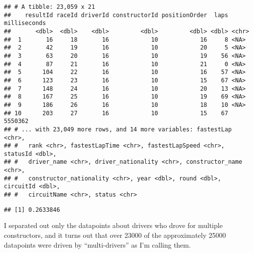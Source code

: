 \documentclass[
]{article}
\newenvironment{Shaded}{\begin{snugshade}}{\end{snugshade}}
\newcommand{\CommentTok}[1]{\textcolor[rgb]{0.56,0.35,0.01}{\textit{#1}}}
\newcommand{\DataTypeTok}[1]{\textcolor[rgb]{0.13,0.29,0.53}{#1}}
\newcommand{\KeywordTok}[1]{\textcolor[rgb]{0.13,0.29,0.53}{\textbf{#1}}}
\newcommand{\NormalTok}[1]{#1}
\newcommand{\OperatorTok}[1]{\textcolor[rgb]{0.81,0.36,0.00}{\textbf{#1}}}
\newcommand{\StringTok}[1]{\textcolor[rgb]{0.31,0.60,0.02}{#1}}
\begin{document}
\begin{verbatim}
## # A tibble: 23,059 x 21
##    resultId raceId driverId constructorId positionOrder  laps milliseconds
##       <dbl>  <dbl>    <dbl>         <dbl>         <dbl> <dbl> <chr>       
##  1       16     18       16            10            16     8 <NA>        
##  2       42     19       16            10            20     5 <NA>        
##  3       63     20       16            10            19    56 <NA>        
##  4       87     21       16            10            21     0 <NA>        
##  5      104     22       16            10            16    57 <NA>        
##  6      123     23       16            10            15    67 <NA>        
##  7      148     24       16            10            20    13 <NA>        
##  8      167     25       16            10            19    69 <NA>        
##  9      186     26       16            10            18    10 <NA>        
## 10      203     27       16            10            15    67 5550362     
## # ... with 23,049 more rows, and 14 more variables: fastestLap <chr>,
## #   rank <chr>, fastestLapTime <chr>, fastestLapSpeed <chr>, statusId <dbl>,
## #   driver_name <chr>, driver_nationality <chr>, constructor_name <chr>,
## #   constructor_nationality <chr>, year <dbl>, round <dbl>, circuitId <dbl>,
## #   circuitName <chr>, status <chr>
\end{verbatim}

\begin{Shaded}
\end{Shaded}

\begin{verbatim}
## [1] 0.2633846
\end{verbatim}

I separated out only the datapoints about drivers who drove for multiple
constructors, and it turns out that over 23000 of the approximately
25000 datapoints were driven by ``multi-drivers'' as I'm calling them.
\end{document}
